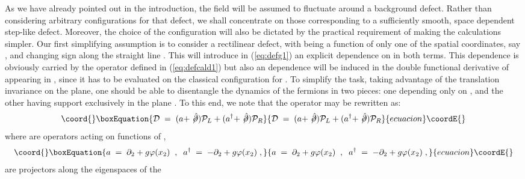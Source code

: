 \documentclass[a4paper,12pt]{article}
\begin{document}
As we have already pointed out in the introduction, the field \myHighlight{$\varphi$}\coordHE{} will
be assumed to fluctuate around a background defect.  Rather than
considering arbitrary configurations for that defect, we shall
concentrate on those corresponding to a sufficiently smooth, space
dependent step-like defect.  Moreover, the choice of the configuration
will also be dictated by the practical requirement of making the
calculations simpler. Our first simplifying assumption is to consider
a rectilinear defect, with \myHighlight{$\varphi$}\coordHE{} being a function of only one of the
spatial coordinates, say \coordHE{}, and changing sign along the straight
line \coordHE{}. This will introduce in (\ref{eq:defg1}) an explicit
dependence on \coordHE{} in both terms. This dependence is obviously
carried by the operator \coordHE{} defined in (\ref{eq:defcald1})
but also an \coordHE{} dependence will be induced in the double functional
derivative of \coordHE{} appearing in \coordHE{}, since it has to be evaluated
on the classical configuration for \myHighlight{$\varphi$}\coordHE{}.  To simplify the task, taking
advantage of the translation invariance on the \coordHE{} plane, one
should be able to disentangle the dynamics of the fermions in two
pieces: one depending only on \coordHE{}, and the other having support
exclusively in the plane \coordHE{}. To this end, we note that the
operator \coordHE{} may be rewritten as:
\begin{equation}\coord{}\boxEquation{
  \label{eq:defcald2}
{\mathcal D} \;=\; (a+\not\!{\hat \partial}) {\mathcal P}_L  
+ (a^\dagger+\not\!{\hat \partial}) {\mathcal P}_R
}{
  {\mathcal D} \;=\; (a+\not\!{\hat \partial}) {\mathcal P}_L  
+ (a^\dagger+\not\!{\hat \partial}) {\mathcal P}_R
}{ecuacion}\coordE{}\end{equation}
where \coordHE{} are operators acting on functions of \coordHE{},
\begin{equation}\coord{}\boxEquation{
  \label{eq:defaad}
a\;=\;\partial_2 + g \varphi(x_2) \;\;,\;\; 
a^\dagger\;=\;-\partial_2 + g \varphi(x_2) \;,
}{
  a\;=\;\partial_2 + g \varphi(x_2) \;\;,\;\; 
a^\dagger\;=\;-\partial_2 + g \varphi(x_2) \;,
}{ecuacion}\coordE{}\end{equation}
\coordHE{} are projectors along the eigenspaces of the
\end{document}
